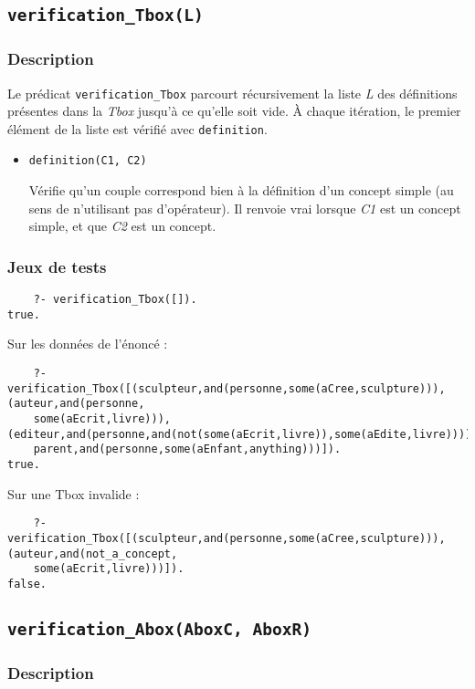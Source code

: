 \documentclass{article}
\newcommand{\code}[1]{\colorbox{light-gray}{\texttt{#1}}}
\begin{document}
\subsection{\code{verification\_Tbox(L)}}
\subsubsection{Description}

Le prédicat \code{verification\_Tbox} parcourt récursivement la liste \textit{L} des définitions présentes dans la \textit{Tbox} jusqu'à ce qu'elle soit vide. À chaque itération, le premier élément de la liste est vérifié avec \code{definition}.
\begin{itemize}
    \item \code{definition(C1, C2)}
    
    Vérifie qu'un couple correspond bien à la définition d'un concept simple (au sens de n'utilisant pas d'opérateur). Il renvoie vrai lorsque \textit{C1} est un concept simple, et que \textit{C2} est un concept.
\end{itemize}
\subsubsection{Jeux de tests}

\begin{verbatim}
    ?- verification_Tbox([]).
true.
\end{verbatim}
Sur les données de l'énoncé :
\begin{verbatim}
    ?- verification_Tbox([(sculpteur,and(personne,some(aCree,sculpture))), (auteur,and(personne,
    some(aEcrit,livre))), (editeur,and(personne,and(not(some(aEcrit,livre)),some(aEdite,livre)))),
    parent,and(personne,some(aEnfant,anything)))]).
true.

\end{verbatim}

Sur une Tbox invalide :
\begin{verbatim}
    ?- verification_Tbox([(sculpteur,and(personne,some(aCree,sculpture))), (auteur,and(not_a_concept,
    some(aEcrit,livre)))]).
false.
\end{verbatim}

\subsection{\code{verification\_Abox(AboxC, AboxR)}}
\subsubsection{Description}
\end{document}
